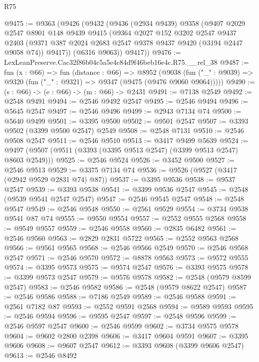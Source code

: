 \begin{lexlean}{R75}
\begin{coremodule}
@9475 := @9363
    (@9426
      (@9432
        (@9436
          (@2934 @9439)
          @9358
          (@9407
            @2029
            @2547
            @8901
            @148
            @9439
            @9415
            (@9364
              @2027
              @152
              @3202
              @2547
              @9437
              @2403
              (@9371 @387 @2024 @2683 @2547 @9378 @9437 @9420 (@3194 @2447 @9058 @74))
              @9417))
          (@6316 @9063))
        @9417))
@9476 := LexLeanPreserve.Cac32f86b04c5a5e4c84d9f46beb16e4c.R75.__rel_38
@9487 := fun (x : @66) =>
  fun (distance : @66) =>
  @8952
    (@9038 (fun ("_" : @9039) => @9320 (fun ("_" : @9321) => @9347 (@9475 (@9476 @9060 @9064)))))
@9490 := (s : @66) -> (e : @66) -> (m : @66) -> @2431
@9491 := @7138 @2549
@9492 := @2548 @9491
@9494 := @2546 @9492 @2547
@9495 := @2546 @9494
@9496 := @5645 @2547
@9497 := @2546 @9496
@9499 := @2943 @7134 @74
@9500 := @5640 @9499
@9501 := @3395 @9500
@9502 := @9501 @2547
@9507 := @3393 @9502 (@3399 @9500 @2547) @2549
@9508 := @2548 @7131
@9510 := @2546 @9508 @2547
@9511 := @2546 @9510
@9513 := @3417 @9499 @5639
@9524 := @9497 (@9507 (@9511 (@3393 (@3395 @9513 @2547) (@3399 @9513 @2547) @8603 @2549)))
@9525 := @2546 @9524
@9526 := @3452 @9500
@9527 := @2546 @9513
@9529 := @3375 @7134 @74
@9536 := @9526 (@9527 (@3417 (@2942 @9529 @2831 @74) @87))
@9537 := @3395 @9536
@9538 := @9537 @2547
@9539 := @3393 @9538
@9541 := @3399 @9536 @2547
@9545 := @2548 (@9539 @9541 @2547 @2547)
@9547 := @2546 @9545 @2547
@9548 := @2548 @9547
@9549 := @2546 @9548
@9550 := @2561 @9529
@9554 := @3734 @9538 @9541 @87 @74
@9555 := @9550 @9554
@9557 := @2552 @9555 @2568
@9558 := @9549 @9557
@9559 := @2546 @9558
@9560 := @2835 @6482
@9561 := @2546 @9560
@9563 := @2829 @2831 @5722
@9565 := @2552 @9563 @2568
@9566 := @9561 @9565
@9568 := @2546 @9566 @2549
@9570 := @2546 @9568 @2547
@9571 := @2546 @9570
@9572 := @8878 @9563
@9573 := @9572 @9555
@9574 := @3395 @9573
@9575 := @9574 @2547
@9576 := @3393 @9575
@9578 := @3399 @9573 @2547
@9579 := @9576 @9578
@9582 := @2548 (@9579 @8599 @2547)
@9583 := @2546 @9582
@9586 := @2548 (@9579 @8622 @2547)
@9587 := @2546 @9586
@9588 := @7186 @2549
@9589 := @2546 @9588
@9591 := @2561 @7182 @87
@9593 := @2552 @9591 @2568
@9594 := @9589 @9593
@9595 := @2546 @9594
@9596 := @9595 @2547
@9597 := @2548 @9596
@9599 := @2546 @9597 @2547
@9600 := @2546 @9599
@9602 := @3734 @9575 @9578
@9604 := @9602 @2800 @2398
@9606 := @3417 @9604 @9591
@9607 := @3395 @9606
@9608 := @9607 @2547
@9612 := @3393 @9608 (@3399 @9606 @2547)
@9613 := @2546 @8492

\end{coremodule}
\end{lexlean}
